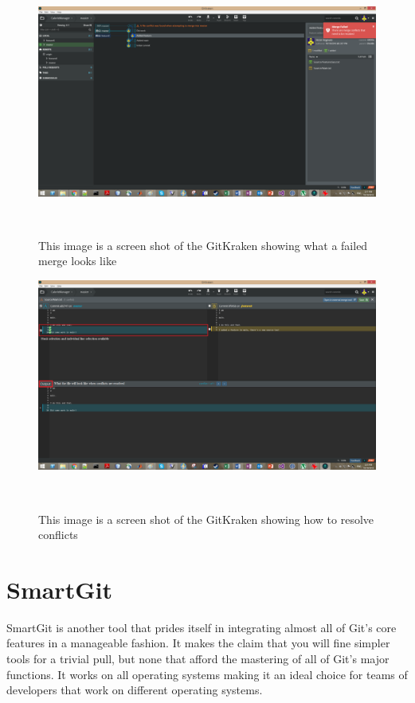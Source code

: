 \documentclass{sigchi}
\begin{document}
\begin{figure}
  \centering
  \includegraphics[width=1.75\columnwidth]{figures/GitKraken/MergeFailedNotification}
  \caption{This image is a screen shot of the GitKraken showing what a failed merge looks like}~\label{fig:GitKrakenFigure5}
\end{figure}

\begin{figure}
  \centering
  \includegraphics[width=1.75\columnwidth]{figures/GitKraken/MergeConflictResolution}
  \caption{This image is a screen shot of the GitKraken showing how to resolve conflicts}~\label{fig:GitKrakenFigure6}
\end{figure}

\section{SmartGit}
SmartGit is another tool that prides itself in integrating almost all of Git's core features in a manageable fashion.
It makes the claim that you will fine simpler tools for a trivial pull, but none that afford the mastering of all of Git's major
functions. It works on all operating systems making it an ideal choice for teams of developers that work on different
operating systems. 
\end{document}
